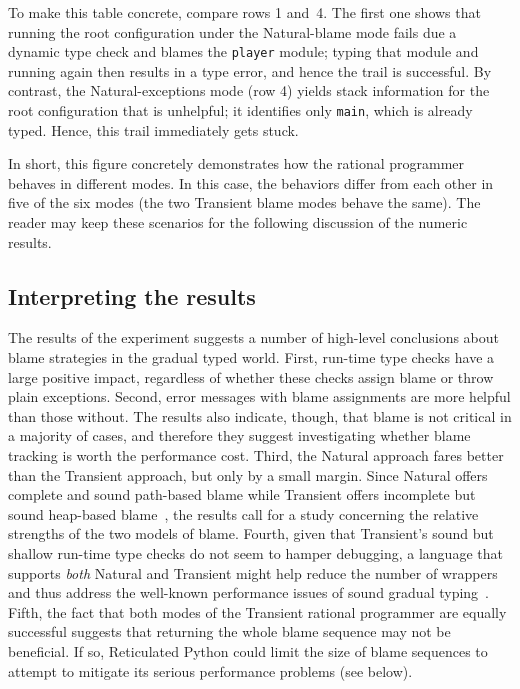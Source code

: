 To make this table concrete, compare rows 1 and~4. The first one shows that
running the root configuration under the Natural-blame mode fails due a dynamic
type check and blames the {\tt player} module; typing that module and running
again then results in a type error, and hence the trail is successful.  By
contrast, the Natural-exceptions mode (row 4) yields stack information for the
root configuration that is unhelpful; it identifies only {\tt main}, which is
already typed. Hence, this trail immediately gets stuck.

In short, this figure concretely demonstrates how the rational programmer
behaves in different modes. In this case, the behaviors differ from each other
in five of the six modes (the two Transient blame modes behave the same).
The reader may keep these scenarios for the following discussion of the numeric results.

\subsection{Interpreting the results}

The results of the experiment suggests a number of high-level conclusions about
blame strategies in the gradual typed world.  First, run-time type checks have a
large positive impact, regardless of whether these checks assign blame or throw
plain exceptions.  Second, error messages with blame assignments are more
helpful than those without. The results also indicate, though, that blame is not
critical in a majority of cases, and therefore they suggest investigating
whether blame tracking is worth the performance cost.  Third, the Natural
approach fares better than the Transient approach, but only by a small margin.
Since Natural offers complete and sound path-based blame  while Transient offers
incomplete but sound heap-based blame~\citep{gfd-oopsla-2019}, the results call
for a study concerning the relative strengths of the two models of blame.
Fourth, given that Transient's sound but shallow run-time type checks do not
seem to hamper debugging, a language that supports {\em both\/} Natural and Transient 
might help reduce the number of wrappers and thus address the well-known
performance issues of sound gradual typing~\citep[chapter~6]{g-dissertation-2020}.  Fifth, the fact that both
modes of the Transient rational programmer are equally successful suggests that
returning the whole blame sequence may not be beneficial. If so, Reticulated
Python could limit the size of blame sequences to attempt to mitigate its
serious performance problems (see below).

